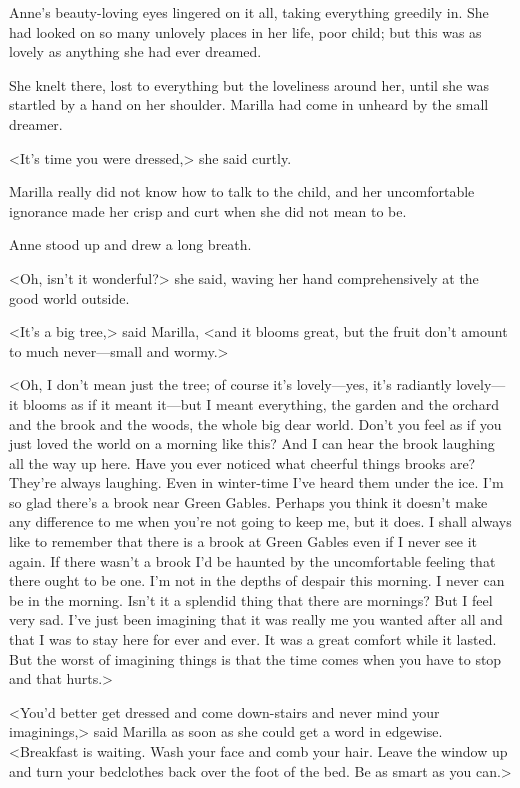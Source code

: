 Anne's beauty-loving eyes lingered on it all, taking everything greedily in. She had looked on so many unlovely places in her life, poor child; but this was as lovely as anything she had ever dreamed.

She knelt there, lost to everything but the loveliness around her, until she was startled by a hand on her shoulder. Marilla had come in unheard by the small dreamer.

<It's time you were dressed,> she said curtly.

Marilla really did not know how to talk to the child, and her uncomfortable ignorance made her crisp and curt when she did not mean to be.

Anne stood up and drew a long breath.

<Oh, isn't it wonderful?> she said, waving her hand comprehensively at the good world outside.

<It's a big tree,> said Marilla, <and it blooms great, but the fruit don't amount to much never—small and wormy.>

<Oh, I don't mean just the tree; of course it's lovely—yes, it's radiantly lovely—it blooms as if it meant it—but I meant everything, the garden and the orchard and the brook and the woods, the whole big dear world. Don't you feel as if you just loved the world on a morning like this? And I can hear the brook laughing all the way up here. Have you ever noticed what cheerful things brooks are? They're always laughing. Even in winter-time I've heard them under the ice. I'm so glad there's a brook near Green Gables. Perhaps you think it doesn't make any difference to me when you're not going to keep me, but it does. I shall always like to remember that there is a brook at Green Gables even if I never see it again. If there wasn't a brook I'd be haunted by the uncomfortable feeling that there ought to be one. I'm not in the depths of despair this morning. I never can be in the morning. Isn't it a splendid thing that there are mornings? But I feel very sad. I've just been imagining that it was really me you wanted after all and that I was to stay here for ever and ever. It was a great comfort while it lasted. But the worst of imagining things is that the time comes when you have to stop and that hurts.>

<You'd better get dressed and come down-stairs and never mind your imaginings,> said Marilla as soon as she could get a word in edgewise. <Breakfast is waiting. Wash your face and comb your hair. Leave the window up and turn your bedclothes back over the foot of the bed. Be as smart as you can.>

